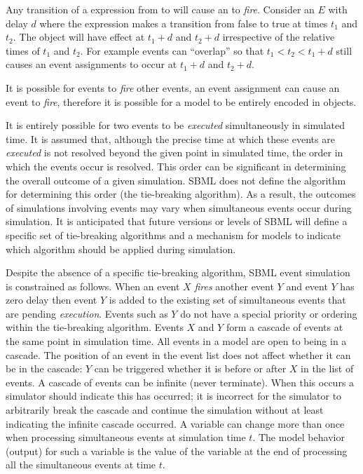 Any transition of a  expression from  to
 will cause an  to \emph{fire}.  Consider
an  $E$ with delay $d$ where the 
expression makes a transition from false to true at times $t_1$
and $t_2$.  The \EventAssignment object will have effect at
$t_1+d$ and $t_2+d$ irrespective of the relative times of $t_1$
and $t_2$. For example events can ``overlap'' so that $t_1 < t_2 <
t_1+d$ still causes an event assignments to occur at $t_1+d$ and
$t_2+d$.

It is possible for events to \emph{fire} other events, \ie an
event assignment can cause an event to \emph{fire}, therefore it
is possible for a model to be entirely encoded in \Event
objects.

It is entirely possible for two events to be \emph{executed}
simultaneously in simulated time.  It is assumed that, although
the precise time at which these events are \emph{executed} is not
resolved beyond the given point in simulated time, the order in
which the events occur is resolved.  This order can be significant
in determining the overall outcome of a given simulation. SBML
\thisL does not define the algorithm for determining this order
(the tie-breaking algorithm).  As a result, the outcomes of
simulations involving events may vary when simultaneous events
occur during simulation.  It is anticipated that future versions
or levels of SBML will define a specific set of tie-breaking
algorithms and a mechanism for models to indicate which algorithm
should be applied during simulation.

Despite the absence of a specific tie-breaking algorithm, SBML
event simulation is constrained as follows. When an event $X$
\emph{fires} another event $Y$ and event $Y$ has zero delay then
event $Y$ is added to the existing set of simultaneous events that
are pending \emph{execution}.  Events such as $Y$ do not have a
special priority or ordering within the tie-breaking algorithm.
Events $X$ and $Y$ form a cascade of events at the same point in
simulation time.  All events in a model are open to being in a
cascade.  The position of an event in the event list does not
affect whether it can be in the cascade: $Y$ can be triggered
whether it is before or after $X$ in the list of events.  A
cascade of events can be infinite (never terminate).  When this
occurs a simulator should indicate this has occurred; \ie it is
incorrect for the simulator to arbitrarily break the cascade and
continue the simulation without at least indicating the infinite
cascade occurred. A variable can change more than once when
processing simultaneous events at simulation time $t$.  The model
behavior (output) for such a variable is the value of the variable
at the end of processing all the simultaneous events at time $t$.











